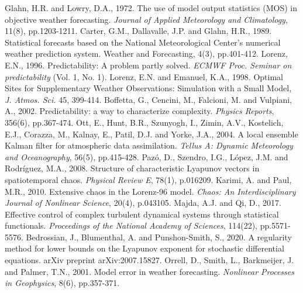 \documentclass[10pt]{article}
\begin{document}
\begin{thebibliography}{99}

 Glahn, H.R. and Lowry, D.A., 1972. The use of model output statistics (MOS) in objective weather forecasting. {\em Journal of Applied Meteorology and Climatology}, 11(8), pp.1203-1211.
 Carter, G.M., Dallavalle, J.P. and Glahn, H.R., 1989. Statistical forecasts based on the National Meteorological Center's numerical weather prediction system. Weather and Forecasting, 4(3), pp.401-412.
 Lorenz, E.N., 1996. Predictability: A problem partly solved. {\em ECMWF Proc. Seminar on predictability} (Vol. 1, No. 1).
 Lorenz, E.N. and Emanuel, K.A., 1998. Optimal Sites for Supplementary Weather Observations: Simulation with a Small Model, {\em J. Atmos. Sci.} 45, 399-414.
 Boffetta, G., Cencini, M., Falcioni, M. and Vulpiani, A., 2002. Predictability: a way to characterize complexity. {\em Physics Reports}, 356(6), pp.367-474.
 Ott, E., Hunt, B.R., Szunyogh, I., Zimin, A.V., Kostelich, E.J., Corazza, M., Kalnay, E., Patil, D.J. and Yorke, J.A., 2004. A local ensemble Kalman filter for atmospheric data assimilation. {\em Tellus A: Dynamic Meteorology and Oceanography}, 56(5), pp.415-428.
 Paz\'o, D., Szendro, I.G., L\'opez, J.M. and Rodríguez, M.A., 2008. Structure of characteristic Lyapunov vectors in spatiotemporal chaos. {\em Physical Review E}, 78(1), p.016209.
 Karimi, A. and Paul, M.R., 2010. Extensive chaos in the Lorenz-96 model. {\em Chaos: An Interdisciplinary Journal of Nonlinear Science}, 20(4), p.043105.
 Majda, A.J. and Qi, D., 2017. Effective control of complex turbulent dynamical systems through statistical functionals. {\em Proceedings of the National Academy of Sciences}, 114(22), pp.5571-5576.
 Bedrossian, J., Blumenthal, A. and Punshon-Smith, S., 2020. A regularity method for lower bounds on the Lyapunov exponent for stochastic differential equations. arXiv preprint arXiv:2007.15827.
 Orrell, D., Smith, L., Barkmeijer, J. and Palmer, T.N., 2001. Model error in weather forecasting. {\em Nonlinear Processes in Geophysics}, 8(6), pp.357-371.
\end{thebibliography}
\end{document}
